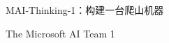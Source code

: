 \documentclass[
  10
]{article}
\author{}
\date{}
\begin{document}
\begin{center}
{\LARGE MAI-Thinking-1：构建一台爬山机器\par}
\end{center}

The Microsoft AI Team 1
\end{document}
